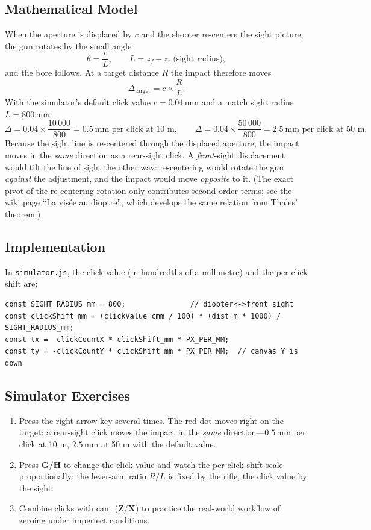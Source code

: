 \documentclass[11pt]{article}
\newcommand{\file}[1]{\texttt{#1}}
\newcommand{\key}[1]{\textsf{\textbf{#1}}}
\begin{document}
\subsection{Mathematical Model}
When the aperture is displaced by $c$ and the shooter re-centers the
sight picture, the gun rotates by the small angle
\[
  \theta = \frac{c}{L},
  \qquad L = z_f - z_r \ \text{(sight radius)},
\]
and the bore follows.  At a target distance $R$ the impact therefore
moves
\begin{equation}\label{eq:clicks}
  \Delta_{\text{target}} = c \times \frac{R}{L}.
\end{equation}
With the simulator's default click value $c = 0.04$\,mm and a match
sight radius $L = 800$\,mm:
\[
  \Delta = 0.04 \times \frac{10\,000}{800} = 0.5\ \text{mm per click at 10 m},
  \qquad
  \Delta = 0.04 \times \frac{50\,000}{800} = 2.5\ \text{mm per click at 50 m}.
\]
Because the sight line is re-centered through the displaced aperture,
the impact moves in the \emph{same} direction as a rear-sight click.
A \emph{front}-sight displacement would tilt the line of sight the
other way: re-centering would rotate the gun \emph{against} the
adjustment, and the impact would move \emph{opposite} to it.  (The
exact pivot of the re-centering rotation only contributes
second-order terms; see the wiki page ``La visée au dioptre'', which
develops the same relation from Thales' theorem.)

\subsection{Implementation}
In \file{simulator.js}, the click value (in hundredths of a
millimetre) and the per-click shift are:
\begin{lstlisting}
const SIGHT_RADIUS_mm = 800;               // diopter<->front sight
const clickShift_mm = (clickValue_cmm / 100) * (dist_m * 1000) / SIGHT_RADIUS_mm;
const tx =  clickCountX * clickShift_mm * PX_PER_MM;
const ty = -clickCountY * clickShift_mm * PX_PER_MM;  // canvas Y is down
\end{lstlisting}

\subsection{Simulator Exercises}
\begin{enumerate}[nosep]
  \item Press the right arrow key several times.  The red dot moves
        right on the target: a rear-sight click moves the impact in
        the \emph{same} direction---$0.5$\,mm per click at 10 m,
        $2.5$\,mm at 50 m with the default value.
  \item Press \key{G}/\key{H} to change the click value and watch the
        per-click shift scale proportionally: the lever-arm ratio
        $R/L$ is fixed by the rifle, the click value by the sight.
  \item Combine clicks with cant (\key{Z}/\key{X}) to practice the
        real-world workflow of zeroing under imperfect conditions.
\end{enumerate}
\end{document}
